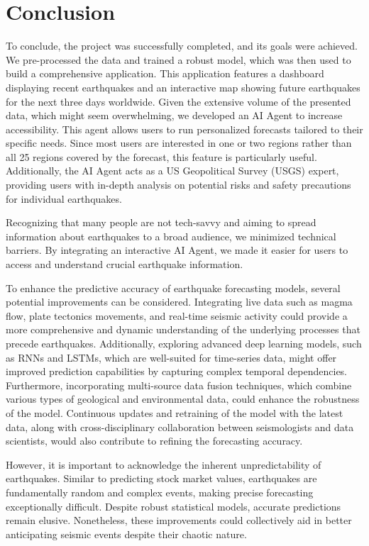 \chapter{Conclusion}\label{ch:conclusion}
To conclude, the project was successfully completed, and its goals were achieved.
We pre-processed the data and trained a robust model, which was then used to build a
comprehensive application. This application features a dashboard displaying recent
earthquakes and an interactive map showing future earthquakes for the next three days
worldwide. Given the extensive volume of the presented data, which might seem overwhelming,
we developed an AI Agent to increase accessibility. This agent allows users to run
personalized forecasts tailored to their specific needs. Since most users are
interested in one or two regions rather than all 25 regions covered by the forecast,
this feature is particularly useful. Additionally, the AI Agent acts as a US Geopolitical Survey (USGS) expert,
providing users with in-depth analysis on potential risks and safety precautions for individual earthquakes.

Recognizing that many people are not tech-savvy and aiming to spread information
about earthquakes to a broad audience, we minimized technical barriers. By integrating
an interactive AI Agent, we made it easier for users to access and understand crucial
earthquake information.

To enhance the predictive accuracy of earthquake forecasting models, several potential
improvements can be considered. Integrating live data such as magma flow, plate tectonics
movements, and real-time seismic activity could provide a more comprehensive and dynamic
understanding of the underlying processes that precede earthquakes. Additionally, exploring
advanced deep learning models, such as \ac{RNNs} and \ac{LSTM}s, which are well-suited for time-series
data, might offer improved prediction capabilities by capturing complex temporal dependencies.
Furthermore, incorporating multi-source data fusion techniques, which combine various types of
geological and environmental data, could enhance the robustness of the model. Continuous
updates and retraining of the model with the latest data, along with cross-disciplinary
collaboration between seismologists and data scientists, would also contribute to refining
the forecasting accuracy.

However, it is important to acknowledge the inherent unpredictability of earthquakes.
Similar to predicting stock market values, earthquakes are fundamentally random and
complex events, making precise forecasting exceptionally difficult. Despite robust
statistical models, accurate predictions remain elusive. Nonetheless, these improvements
could collectively aid in better anticipating seismic events despite their chaotic nature.